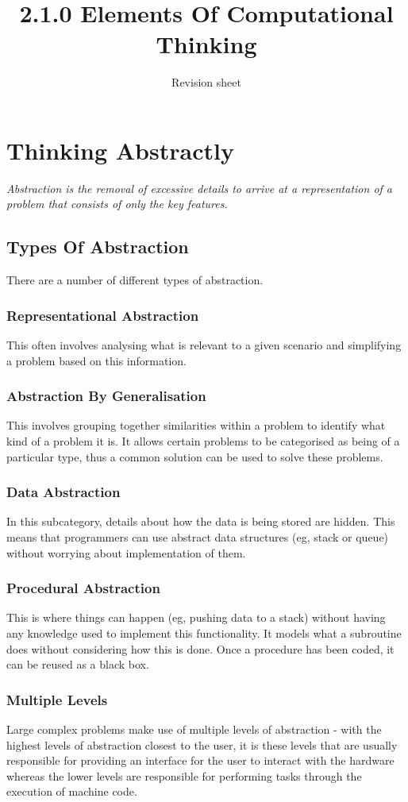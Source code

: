 \documentclass[a4paper,11pt, twocolumn]{article}
\title{2.1.0 Elements Of Computational Thinking}
\author{Revision sheet}
\date{}
\begin{document}
\maketitle
\thispagestyle{fancy}

\section{Thinking Abstractly}
\textit{Abstraction is the removal of excessive details to arrive at a representation of a problem that consists of only the key features.} 
\subsection{Types Of Abstraction}
There are a number of different types of abstraction.
\subsubsection{Representational Abstraction}
This often involves analysing what is relevant to a given scenario and simplifying a problem based on this information.
\subsubsection{Abstraction By Generalisation}
This involves grouping together similarities within a problem to identify what kind of a problem it is. It allows certain problems to be categorised as being of a particular type, thus a common solution can be used to solve these problems.
\subsubsection{Data Abstraction}
In this subcategory, details about how the data is being stored are hidden. This means that programmers can use abstract data structures (eg, stack or queue) without worrying about implementation of them.
\subsubsection{Procedural Abstraction}
This is where things can happen (eg, pushing data to a stack) without having any knowledge used to implement this functionality. It models what a subroutine does without considering how this is done. Once a procedure has been coded, it can be reused as a black box.
\subsubsection{Multiple Levels}
Large complex problems make use of multiple levels of abstraction - with the highest levels of abstraction closest to the user, it is these levels that are usually responsible for providing an interface for the user to interact with the hardware whereas the lower levels are responsible for performing tasks through the execution of machine code.
\end{document}

